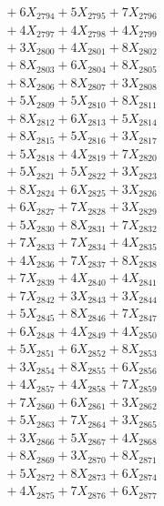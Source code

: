 \documentclass[a4paper,10pt]{article}
\begin{document}
{\begin{align}
&\;  + 6 X_{2794} + 5 X_{2795} + 7 X_{2796} \\[0.3ex]
&\;  + 4 X_{2797} + 4 X_{2798} + 4 X_{2799} \\[0.5ex]\allowbreak
&\;  + 3 X_{2800} + 4 X_{2801} + 8 X_{2802} \\[0.3ex]
&\;  + 8 X_{2803} + 6 X_{2804} + 8 X_{2805} \\[0.3ex]
&\;  + 8 X_{2806} + 8 X_{2807} + 3 X_{2808} \\[0.3ex]
&\;  + 5 X_{2809} + 5 X_{2810} + 8 X_{2811} \\[0.3ex]
&\;  + 8 X_{2812} + 6 X_{2813} + 5 X_{2814} \\[0.3ex]
&\;  + 8 X_{2815} + 5 X_{2816} + 3 X_{2817} \\[0.3ex]
&\;  + 5 X_{2818} + 4 X_{2819} + 7 X_{2820} \\[0.3ex]
&\;  + 5 X_{2821} + 5 X_{2822} + 3 X_{2823} \\[0.3ex]
&\;  + 8 X_{2824} + 6 X_{2825} + 3 X_{2826} \\[0.3ex]
&\;  + 6 X_{2827} + 7 X_{2828} + 3 X_{2829} \\[0.5ex]\allowbreak
&\;  + 5 X_{2830} + 8 X_{2831} + 7 X_{2832} \\[0.3ex]
&\;  + 7 X_{2833} + 7 X_{2834} + 4 X_{2835} \\[0.3ex]
&\;  + 4 X_{2836} + 7 X_{2837} + 8 X_{2838} \\[0.3ex]
&\;  + 7 X_{2839} + 4 X_{2840} + 4 X_{2841} \\[0.3ex]
&\;  + 7 X_{2842} + 3 X_{2843} + 3 X_{2844} \\[0.3ex]
&\;  + 5 X_{2845} + 8 X_{2846} + 7 X_{2847} \\[0.3ex]
&\;  + 6 X_{2848} + 4 X_{2849} + 4 X_{2850} \\[0.3ex]
&\;  + 5 X_{2851} + 6 X_{2852} + 8 X_{2853} \\[0.3ex]
&\;  + 3 X_{2854} + 8 X_{2855} + 6 X_{2856} \\[0.3ex]
&\;  + 4 X_{2857} + 4 X_{2858} + 7 X_{2859} \\[0.5ex]\allowbreak
&\;  + 7 X_{2860} + 6 X_{2861} + 3 X_{2862} \\[0.3ex]
&\;  + 5 X_{2863} + 7 X_{2864} + 3 X_{2865} \\[0.3ex]
&\;  + 3 X_{2866} + 5 X_{2867} + 4 X_{2868} \\[0.3ex]
&\;  + 8 X_{2869} + 3 X_{2870} + 8 X_{2871} \\[0.3ex]
&\;  + 5 X_{2872} + 8 X_{2873} + 6 X_{2874} \\[0.3ex]
&\;  + 4 X_{2875} + 7 X_{2876} + 6 X_{2877} \\[0.3ex]

\end{align}}
\end{document}
